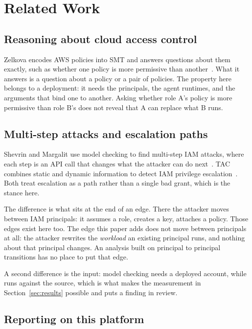 \section{Related Work}
\label{sec:related}

\subsection{Reasoning about cloud access control}

Zelkova encodes AWS policies into SMT and answers questions about them
exactly, such as whether one policy is more permissive than
another~\cite{backes2018zelkova}. What it answers is a question about a policy
or a pair of policies. The property here belongs to a deployment: it needs the
principals, the agent runtimes, and the arguments that bind one to another.
Asking whether role A's policy is more permissive than role B's does not
reveal that A can replace what B runs.

\subsection{Multi-step attacks and escalation paths}

Shevrin and Margalit use model checking to find multi-step IAM attacks, where
each step is an API call that changes what the attacker can do
next~\cite{shevrin2023multistep}. TAC combines static and dynamic information
to detect IAM privilege escalation~\cite{hu2023tac}. Both treat escalation as
a path rather than a single bad grant, which is the stance here.

The difference is what sits at the end of an edge. There the attacker moves
between IAM principals: it assumes a role, creates a key, attaches a policy.
Those edges exist here too. The edge this paper adds does not move between
principals at all: the attacker rewrites the \emph{workload} an existing
principal runs, and nothing about that principal changes. An analysis built on
principal to principal transitions has no place to put that edge.

A second difference is the input: model checking needs a deployed account,
while \tool runs against the source, which is what makes the measurement in
Section~\ref{sec:results} possible and puts a finding in review.

\subsection{Reporting on this platform}
\label{sec:industry}

